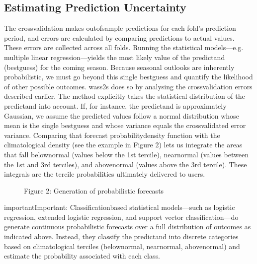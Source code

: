 \documentclass[letterpaper,10pt,english]{sphinxmanual}
\begin{document}
\subsection{Estimating Prediction Uncertainty}
\label{\detokenize{cv:estimating-prediction-uncertainty}}
\sphinxAtStartPar
The cross\sphinxhyphen{}validation makes out\sphinxhyphen{}of\sphinxhyphen{}sample predictions for each fold’s prediction period, and errors are calculated by comparing predictions to actual values. These errors are collected across all folds.
Running the statistical models—e.g. multiple linear regression—yields the most likely value of the predictand (best\sphinxhyphen{}guess) for the coming season.
Because seasonal outlooks are inherently probabilistic, we must go beyond this single best\sphinxhyphen{}guess and quantify the likelihood of other possible outcomes.
wass2s does so by analysing the cross\sphinxhyphen{}validation errors described earlier. The method explicitly takes the statistical distribution of the predictand into account.
If, for instance, the predictand is approximately Gaussian, we assume the predicted values follow a normal distribution whose mean is the single best\sphinxhyphen{}guess and whose variance equals the cross\sphinxhyphen{}validated error variance.
Comparing that forecast probability\sphinxhyphen{}density function with the climatological density (see the example in Figure 2) lets us integrate the areas that fall below\sphinxhyphen{}normal (values below the 1st tercile), near\sphinxhyphen{}normal (values between the 1st and 3rd terciles), and above\sphinxhyphen{}normal (values above the 3rd tercile).
These integrals are the tercile probabilities ultimately delivered to users.

\begin{figure}[htbp]
\centering
\capstart

\noindent{}
\caption{Figure 2: Generation of probabilistic forecasts}\label{\detokenize{cv:id2}}\end{figure}

\begin{sphinxadmonition}{important}{Important:}
\sphinxAtStartPar
Classification\sphinxhyphen{}based statistical models—such as logistic regression,
extended logistic regression, and support vector classification—do 
generate continuous probabilistic forecasts over a full distribution of outcomes as indicated above.
Instead, they classify the predictand into discrete categories based on
climatological terciles (below\sphinxhyphen{}normal, near\sphinxhyphen{}normal, above\sphinxhyphen{}normal) and
estimate the probability associated with each class.
\end{sphinxadmonition}
\end{document}
